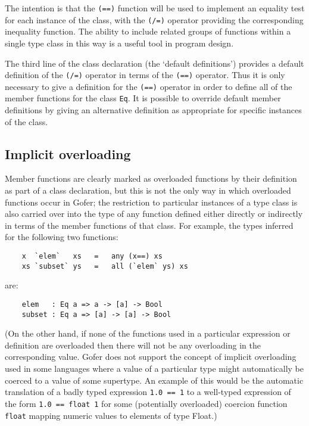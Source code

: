      The intention is that the \verb"(==)" function will be used to  implement
     an equality test for each instance of the  class,  with  the  \verb"(/=)"
     operator providing the  corresponding  inequality  function.   The
     ability to include related groups of  functions  within  a  single
     type class in this way is a useful tool in program design.

\IT  The  third  line  of   the   class   declaration   (the   `default
     definitions') provides a default definition of the  \verb"(/=)"  operator
     in terms of the \verb"(==)" operator.  Thus it is only necessary to  give
     a definition for the \verb"(==)" operator in order to define all  of  the
     member functions for the class \verb"Eq".  It  is  possible  to  override
     default member definitions by giving an alternative definition  as
     appropriate for specific instances of the class.
\EI
\subsection{Implicit overloading}
Member functions are clearly marked as overloaded  functions  by  their
definition as part of a class declaration, but this is not the only way
in which overloaded  functions  occur  in  Gofer;  the  restriction  to
particular instances of a type class is also carried over into the type
of any function defined either directly or indirectly in terms  of  the
member functions of that class.  For example, the  types  inferred  for
the following two functions:
\begin{verbatim}
    x  `elem`   xs   =   any (x==) xs
    xs `subset` ys   =   all (`elem` ys) xs
\end{verbatim}
are:
\begin{verbatim}
    elem   : Eq a => a -> [a] -> Bool
    subset : Eq a => [a] -> [a] -> Bool
\end{verbatim}
(On the  other  hand,  if  none  of  the  functions  used  in  a
particular expression or definition are overloaded then there will  not
be any overloading in the corresponding value.  Gofer does not  support
the concept of implicit overloading used  in  some  languages  where  a
value of a particular type might automatically be coerced to a value of
some supertype.  An example of this would be the automatic  translation
of a badly typed expression \verb"1.0 == 1" to a  well-typed  expression  of
the form \verb"1.0 == float 1" for some  (potentially  overloaded)  coercion
function \verb"float" mapping numeric values to elements of type Float.)

